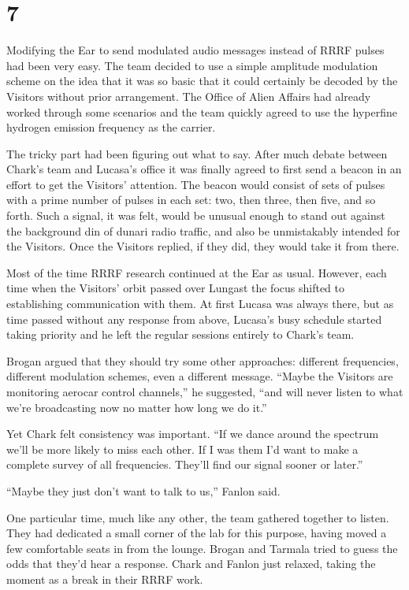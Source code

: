 
\chapter{7}

Modifying the Ear to send modulated audio messages instead of RRRF pulses had been very easy.
The team decided to use a simple amplitude modulation scheme on the idea that it was so basic
that it could certainly be decoded by the Visitors without prior arrangement. The Office of
Alien Affairs had already worked through some scenarios and the team quickly agreed to use the
hyperfine hydrogen emission frequency as the carrier.

The tricky part had been figuring out what to say. After much debate between Chark's team and
Lucasa's office it was finally agreed to first send a beacon in an effort to get the Visitors'
attention. The beacon would consist of sets of pulses with a prime number of pulses in each set:
two, then three, then five, and so forth. Such a signal, it was felt, would be unusual enough to
stand out against the background din of dunari radio traffic, and also be unmistakably intended
for the Visitors. Once the Visitors replied, if they did, they would take it from there.

Most of the time RRRF research continued at the Ear as usual. However, each time when the
Visitors' orbit passed over Lungast the focus shifted to establishing communication with them.
At first Lucasa was always there, but as time passed without any response from above, Lucasa's
busy schedule started taking priority and he left the regular sessions entirely to Chark's team.

Brogan argued that they should try some other approaches: different frequencies, different
modulation schemes, even a different message. ``Maybe the Visitors are monitoring aerocar
control channels,'' he suggested, ``and will never listen to what we're broadcasting now no
matter how long we do it.''

Yet Chark felt consistency was important. ``If we dance around the spectrum we'll be more likely
to miss each other. If I was them I'd want to make a complete survey of all frequencies. They'll
find our signal sooner or later.''

``Maybe they just don't want to talk to us,'' Fanlon said.

One particular time, much like any other, the team gathered together to listen. They had
dedicated a small corner of the lab for this purpose, having moved a few comfortable seats in
from the lounge. Brogan and Tarmala tried to guess the odds that they'd hear a response. Chark
and Fanlon just relaxed, taking the moment as a break in their RRRF work.

